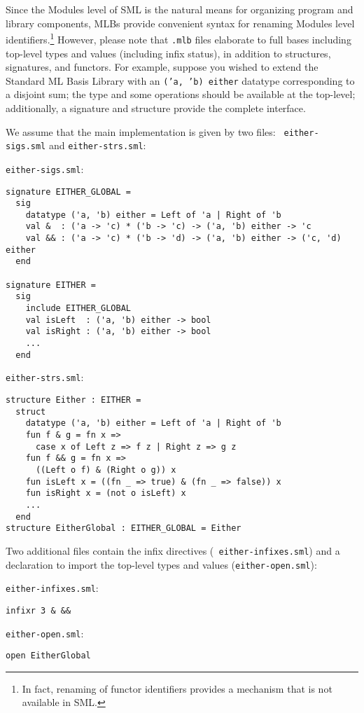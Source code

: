 Since the Modules level of SML is the natural means for organizing
program and library components, MLBs provide convenient syntax for
renaming Modules level identifiers.\footnote{In fact, renaming of
functor identifiers provides a mechanism that is not available in
SML.}  However, please note that {\tt .mlb} files elaborate to full
bases including top-level types and values (including infix status),
in addition to structures, signatures, and functors.  For example,
suppose you wished to extend the Standard ML Basis Library with an
{\tt ('a, 'b) either} datatype corresponding to a disjoint sum; the
type and some operations should be available at the top-level;
additionally, a signature and structure provide the complete
interface.

We assume that the main implementation is given by two files: {\tt
either-sigs.sml} and {\tt either-strs.sml}:

\begin{description}
\item{{\tt either-sigs.sml}:}
\begin{verbatim}
signature EITHER_GLOBAL =
  sig
    datatype ('a, 'b) either = Left of 'a | Right of 'b
    val &  : ('a -> 'c) * ('b -> 'c) -> ('a, 'b) either -> 'c
    val && : ('a -> 'c) * ('b -> 'd) -> ('a, 'b) either -> ('c, 'd) either
  end

signature EITHER =
  sig
    include EITHER_GLOBAL
    val isLeft  : ('a, 'b) either -> bool
    val isRight : ('a, 'b) either -> bool
    ...
  end
\end{verbatim}
\item{{\tt either-strs.sml}:}
\begin{verbatim}
structure Either : EITHER =
  struct
    datatype ('a, 'b) either = Left of 'a | Right of 'b
    fun f & g = fn x =>
      case x of Left z => f z | Right z => g z
    fun f && g = fn x =>
      ((Left o f) & (Right o g)) x
    fun isLeft x = ((fn _ => true) & (fn _ => false)) x
    fun isRight x = (not o isLeft) x
    ...
  end
structure EitherGlobal : EITHER_GLOBAL = Either
\end{verbatim}
\end{description}

Two additional files contain the infix directives ({\tt
either-infixes.sml}) and a declaration to import the top-level types
and values ({\tt either-open.sml}):
\begin{description}
\item{{\tt either-infixes.sml}:}
\begin{verbatim}
infixr 3 & &&
\end{verbatim}
\item{{\tt either-open.sml}:}
\begin{verbatim}
open EitherGlobal
\end{verbatim}
\end{description}

